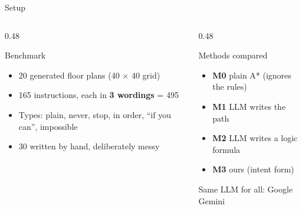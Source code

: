 \documentclass[aspectratio=169]{beamer}
\begin{document}
\begin{frame}{Setup}
  \begin{columns}[T]
    \begin{column}{0.48\textwidth}
      \begin{block}{Benchmark}
        \begin{itemize}
          \item 20 generated floor plans (40 × 40 grid)
          \item 165 instructions, each in \textbf{3 wordings} = 495
          \item Types: plain, never, stop, in order, ``if you can'', impossible
          \item 30 written by hand, deliberately messy
        \end{itemize}
      \end{block}
    \end{column}
    \begin{column}{0.48\textwidth}
      \begin{block}{Methods compared}
        \begin{itemize}
          \item \textbf{M0} plain A* (ignores the rules)
          \item \textbf{M1} LLM writes the path
          \item \textbf{M2} LLM writes a logic formula
          \item \textbf{M3} ours (intent form)
        \end{itemize}
        Same LLM for all: Google Gemini
      \end{block}
    \end{column}
  \end{columns}
\end{frame}
\end{document}
